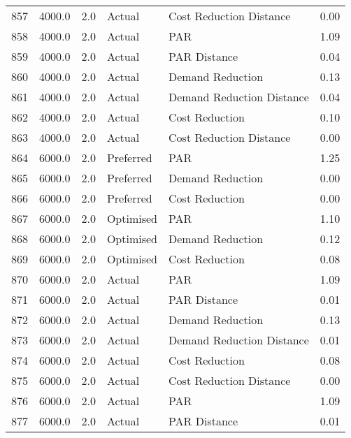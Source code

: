 \begin{longtable}{lrrllr}
857  &       4000.0 &     2.0 &         Actual &    Cost Reduction Distance &   0.00 \\
858  &       4000.0 &     2.0 &         Actual &                        PAR &   1.09 \\
859  &       4000.0 &     2.0 &         Actual &               PAR Distance &   0.04 \\
860  &       4000.0 &     2.0 &         Actual &           Demand Reduction &   0.13 \\
861  &       4000.0 &     2.0 &         Actual &  Demand Reduction Distance &   0.04 \\
862  &       4000.0 &     2.0 &         Actual &             Cost Reduction &   0.10 \\
863  &       4000.0 &     2.0 &         Actual &    Cost Reduction Distance &   0.00 \\
864  &       6000.0 &     2.0 &      Preferred &                        PAR &   1.25 \\
865  &       6000.0 &     2.0 &      Preferred &           Demand Reduction &   0.00 \\
866  &       6000.0 &     2.0 &      Preferred &             Cost Reduction &   0.00 \\
867  &       6000.0 &     2.0 &      Optimised &                        PAR &   1.10 \\
868  &       6000.0 &     2.0 &      Optimised &           Demand Reduction &   0.12 \\
869  &       6000.0 &     2.0 &      Optimised &             Cost Reduction &   0.08 \\
870  &       6000.0 &     2.0 &         Actual &                        PAR &   1.09 \\
871  &       6000.0 &     2.0 &         Actual &               PAR Distance &   0.01 \\
872  &       6000.0 &     2.0 &         Actual &           Demand Reduction &   0.13 \\
873  &       6000.0 &     2.0 &         Actual &  Demand Reduction Distance &   0.01 \\
874  &       6000.0 &     2.0 &         Actual &             Cost Reduction &   0.08 \\
875  &       6000.0 &     2.0 &         Actual &    Cost Reduction Distance &   0.00 \\
876  &       6000.0 &     2.0 &         Actual &                        PAR &   1.09 \\
877  &       6000.0 &     2.0 &         Actual &               PAR Distance &   0.01 \\

\end{longtable}
